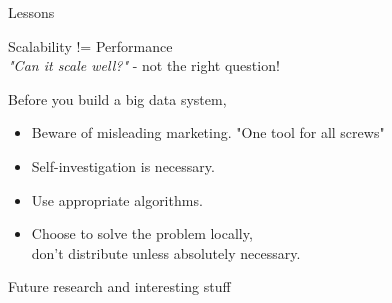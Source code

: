 \begin{frame}[t]{Lessons}

  \begin{center}
    \large{Scalability != Performance}\\
    \vspace{0.1cm}
    \textit{"Can it scale well?"} - not the right question!
  \end{center}
  
  \vspace{0.5cm}
  \pause
  
  Before you build a big data system,
  \vspace{0.1cm}
  \begin{itemize}
    \item Beware of misleading marketing. "One tool for all screws"
    \item Self-investigation is necessary.
    \item Use appropriate algorithms.
    \item Choose to solve the problem locally,\\ don't distribute unless absolutely necessary.
  \end{itemize}

\end{frame}

\begin{frame}[t]{Future research and interesting stuff}

\end{frame}


